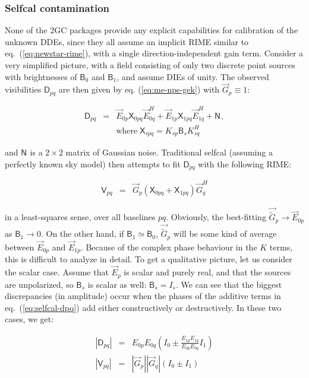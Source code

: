 \documentclass[]{aa}
\newcommand{\herm}{H}
\newcommand{\jones}[2]{\vec {#1}_{#2}}
\newcommand{\jonesT}[2]{\vec {#1}^{\herm}_{#2}}
\newcommand{\coh}[2]{\mathsf{{#1}}_{{#2}}}
\begin{document}
\subsubsection{Selfcal contamination}

None of the 2GC packages provide any explicit capabilities for calibration of the unknown DDEs, since they all assume an implicit RIME similar to eq.~(\ref{eq:newstar-rime}), with a single direction-independent gain term. Consider a very simplified picture, with a field consisting of only two discrete point sources with brightnesses of $\coh{B}{0}$ and $\coh{B}{1}$, and assume DIEs of unity. The observed visibilities $\coh{D}{pq}$ are then given by eq. (\ref{eq:me-nps-gek}) with $\jones{G}{p}\equiv1$:

\begin{eqnarray}\label{eq:selfcal-dpq}
\coh{D}{pq} & = & \jones{E}{0p} \coh{X}{0pq} \jonesT{E}{0q} + \jones{E}{1p} \coh{X}{1pq} \jonesT{E}{1q} + \coh{N}{}, \\
\nonumber && \mathrm{where}\; \coh{X}{spq} = K_{sp} \coh{B}{s} K^\herm_{sq}
\end{eqnarray}  

and $\coh{N}{}$ is a $2\times2$ matrix of Gaussian noise. Traditional selfcal (assuming a perfectly known sky model) then attempts to fit $\coh{D}{pq}$ with the following RIME:

\begin{eqnarray}\label{eq:selfcal-vpq}
\coh{V}{pq} & = & \jones{G}{p} ( \coh{X}{0pq} + \coh{X}{1pq} ) \jonesT{G}{q}
\end{eqnarray}

in a least-squares sense, over all baselines $pq$. Obviously, the best-fitting $\jones{\tilde G}{p}\to\jones{E}{0p}$ as $\coh{B}{1}\to0$. On the other hand, if $\coh{B}{1}\simeq\coh{B}{0}$, $\jones{\tilde G}{p}$ will be some kind of average between $\jones{E}{0p}$ and $\jones{E}{1p}$. Because of the complex phase behaviour in the $K$ terms, this is difficult to analyze in detail. To get a qualitative picture, let us consider the scalar case. Assume that $\jones{E}{p}$ is scalar and purely real, and that the sources are unpolarized, so $\coh{B}{s}$ is scalar as well: $\coh{B}{s}=I_s$. We can see that the biggest discrepancies (in amplitude) occur when the phases of the additive terms in eq.~(\ref{eq:selfcal-dpq}) add either constructively or destructively. In these two cases, we get:

\begin{eqnarray*}
|\coh{D}{pq}| & = & E_{0p} E_{0q} ( I_0 \pm \frac{E_{1p} E_{1q}}{E_{0p} E_{0q}} I_1 ) \\
|\coh{V}{pq}| & = & |\jones{G}{p}| |\jones{G}{q}| ( I_0 \pm I_1 ) \\
\end{eqnarray*}
\end{document}
